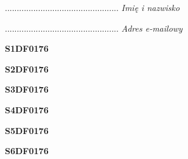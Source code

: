 \begin{turn}{90}\begin{minipage}{\linewidth} \vspace{20mm} ................................................  \textit{Imię i nazwisko}\end{minipage}\end{turn}

\begin{turn}{90}\begin{minipage}{\linewidth} \vspace{20mm} ................................................  \textit{Adres e-mailowy}\end{minipage}\end{turn}

\begin{turn}{90}\huge \begin{minipage}{\linewidth} \vspace{10mm}\textbf{S1DF0176}\end{minipage}\end{turn}

\begin{turn}{90}\huge \begin{minipage}{\linewidth} \vspace{10mm}\textbf{S2DF0176}\end{minipage}\end{turn}

\begin{turn}{90}\huge \begin{minipage}{\linewidth} \vspace{10mm}\textbf{S3DF0176}\end{minipage}\end{turn}

\begin{turn}{90}\huge \begin{minipage}{\linewidth} \vspace{10mm}\textbf{S4DF0176}\end{minipage}\end{turn}

\begin{turn}{90}\huge \begin{minipage}{\linewidth} \vspace{10mm}\textbf{S5DF0176}\end{minipage}\end{turn}

\begin{turn}{90}\huge \begin{minipage}{\linewidth} \vspace{10mm}\textbf{S6DF0176}\end{minipage}\end{turn}

